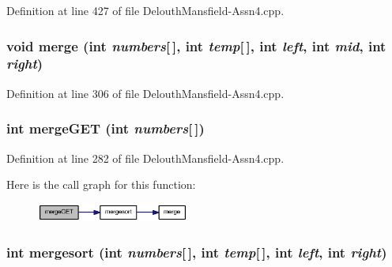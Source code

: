 Definition at line 427 of file DelouthMansfield-\/Assn4.cpp.

\hypertarget{_delouth_mansfield-_assn4_8cpp_a22dd5c604dfcb67bc46bfd4bbb97d2f0}{
\subsubsection[{merge}]{\setlength{\rightskip}{0pt plus 5cm}void merge (int {\em numbers}\mbox{[}$\,$\mbox{]}, \/  int {\em temp}\mbox{[}$\,$\mbox{]}, \/  int {\em left}, \/  int {\em mid}, \/  int {\em right})}}
\label{_delouth_mansfield-_assn4_8cpp_a22dd5c604dfcb67bc46bfd4bbb97d2f0}


Definition at line 306 of file DelouthMansfield-\/Assn4.cpp.

\hypertarget{_delouth_mansfield-_assn4_8cpp_a5bf887ba10188a54f08008fba4edd364}{
\subsubsection[{mergeGET}]{\setlength{\rightskip}{0pt plus 5cm}int mergeGET (int {\em numbers}\mbox{[}$\,$\mbox{]})}}
\label{_delouth_mansfield-_assn4_8cpp_a5bf887ba10188a54f08008fba4edd364}


Definition at line 282 of file DelouthMansfield-\/Assn4.cpp.



Here is the call graph for this function:\nopagebreak
\begin{figure}[H]
\begin{center}
\leavevmode
\includegraphics[width=142pt]{_delouth_mansfield-_assn4_8cpp_a5bf887ba10188a54f08008fba4edd364_cgraph}
\end{center}
\end{figure}


\hypertarget{_delouth_mansfield-_assn4_8cpp_a5f5d9f539f726c766f4c454c579f2f6d}{
\subsubsection[{mergesort}]{\setlength{\rightskip}{0pt plus 5cm}int mergesort (int {\em numbers}\mbox{[}$\,$\mbox{]}, \/  int {\em temp}\mbox{[}$\,$\mbox{]}, \/  int {\em left}, \/  int {\em right})}}
\label{_delouth_mansfield-_assn4_8cpp_a5f5d9f539f726c766f4c454c579f2f6d}


